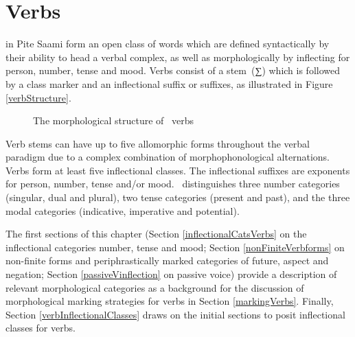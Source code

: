 

\chapter{Verbs}\label{verbs}
 in Pite Saami form an open class of words which are defined syntactically by their ability to head a verbal complex, as well as morphologically by inflecting for person, number, tense and mood. 
Verbs consist of a \mbox{stem (∑)} which is followed by a class marker and an inflectional suffix or suffixes, %
as illustrated in Figure \vref{verbStructure}.
\begin{figure}\centering
{}
\caption{The morphological structure of \PS\ verbs}\label{verbStructure}
\end{figure}

Verb stems can have up to five allomorphic forms throughout the verbal para\-digm due to a complex combination of morphophonological alternations. 
Verbs form at least five inflectional classes. 
The inflectional suffixes are exponents for person, number, tense and/or mood. 
\PS\ distinguishes three number categories (singular, dual and plural), two tense categories (present and past), and the three modal categories (indicative, imperative and potential). 


The first sections of this chapter (Section \ref{inflectionalCatsVerbs} on the inflectional categories number, tense and mood; Section \ref{nonFiniteVerbforms} on non-finite forms and periphrastically marked categories of future, aspect and negation; Section \ref{passiveVinflection} on passive voice) provide a description of relevant morphological categories as a background for the discussion of morphological marking strategies for verbs in Section \ref{markingVerbs}. Finally, Section \ref{verbInflectionalClasses} draws on the initial sections to posit inflectional classes for verbs. 


